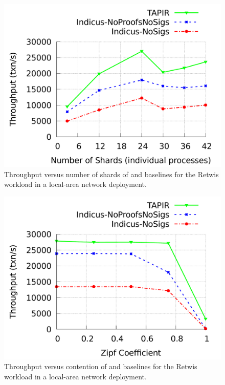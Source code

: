 \begin{figure}
  \includegraphics[width=\columnwidth]{figures/eval/retwis-tput-shards.pdf}
  \caption{Throughput versus number of shards of \sys{} and baselines for the Retwis
  workload in a local-area network deployment.}
  \label{fig:retwis-tput-shards}
\end{figure}

\begin{figure}
  \includegraphics[width=\columnwidth]{figures/eval/retwis-tput-zipf.pdf}
  \caption{Throughput versus contention of \sys{} and baselines for the Retwis
  workload in a local-area network deployment.}
  \label{fig:retwis-tput-zipf}
\end{figure}

